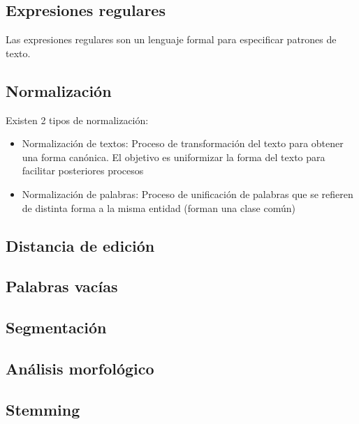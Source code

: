 \documentclass{ctexart}
\begin{document}
	\subsection{Expresiones regulares}
	\begin{flushleft}
		Las expresiones regulares son un lenguaje formal para especificar patrones de texto.
	\end{flushleft}
	\subsection{Normalización}
	\begin{flushleft}
		Existen 2 tipos de normalización:
		\begin{itemize}
			\item Normalización de textos: Proceso de transformación del texto para obtener una forma canónica. El objetivo es uniformizar la forma del texto para facilitar posteriores procesos
			\item Normalización de palabras: Proceso de unificación de palabras que se refieren de distinta	forma a la misma entidad (forman una clase común)
		\end{itemize}
	\end{flushleft}
	\subsection{Distancia de edición}
	\begin{flushleft}
	\end{flushleft}
	\subsection{Palabras vacías}
	\begin{flushleft}
	\end{flushleft}
	\subsection{Segmentación}
	\begin{flushleft}
	\end{flushleft}
	\subsection{Análisis morfológico}
	\begin{flushleft}
	\end{flushleft}
	\subsection{Stemming}
	\begin{flushleft}
	\end{flushleft}
\end{document}
